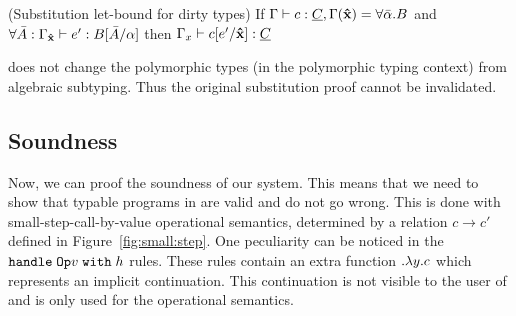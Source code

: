 \begin{theorem}
\label{thm:sub:let:drty}
(Substitution let-bound for dirty types) If $\Gamma \vdash c \mathrel{:} \underline{C}, \Gamma(\textbf{\^{x}}) = \forall \bar{\alpha} . B$ and $\forall \bar{A}: \Gamma_{\textbf{\^{x}}} \vdash e' \mathrel{:} B[\bar{A}/\alpha]$ then $\Gamma_x \vdash c[e'/\textbf{\^{x}}] \mathrel{:} \underline{C}$
\end{theorem}
\core does not change the polymorphic types (in the polymorphic typing context) from algebraic subtyping. Thus the original substitution proof cannot be invalidated.


\subsection{Soundness}
Now, we can proof the soundness of our system. This means that we need to show that typable programs in \core are valid and do not go wrong. This is done with small-step-call-by-value operational semantics, determined by a relation $c \longrightarrow c'$ defined in Figure~\ref{fig:small:step}. One peculiarity can be noticed in the $\mathtt{handle}\; \mathtt{Op} v \;\mathtt{with}\; h$ rules. These rules contain an extra function $.\lambda y .c$ which represents an implicit continuation. This continuation is not visible to the user of \core and is only used for the operational semantics. 

